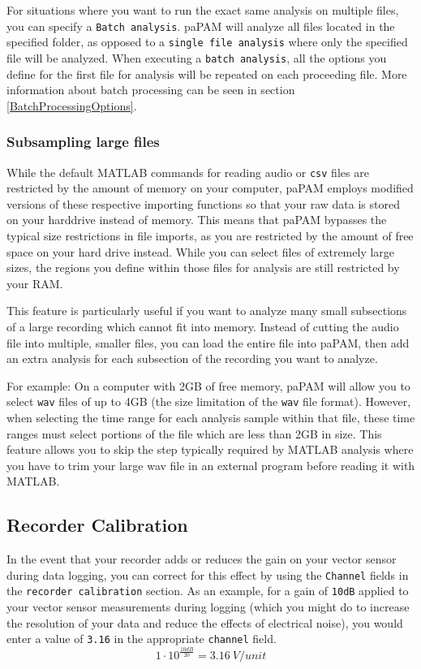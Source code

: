 \documentclass[11pt]{report}
\begin{document}
For situations where you want to run the exact same analysis on multiple
files, you can specify a \texttt{Batch analysis}. paPAM will analyze all files located
in the specified folder, as opposed to a \texttt{single file analysis} where only
the specified file will be analyzed. When executing a \texttt{batch analysis}, all the
options you define for the first file for analysis will be repeated
on each proceeding file. More information about batch processing can be
seen in section \ref{BatchProcessingOptions}.

\subsubsection{Subsampling large files}
While the default MATLAB commands for reading audio or \texttt{csv} files are restricted by the amount of memory on your computer, paPAM employs modified versions of these respective importing functions so that your raw data is stored on your harddrive instead of memory.  This means that paPAM bypasses the typical size restrictions in file imports, as you are restricted by the amount of free space on your hard drive instead.  While you can select files of extremely large sizes, the regions you define within those files for analysis are still restricted by your RAM.  

This feature is particularly useful if you want to analyze many small subsections of a large recording which cannot fit into memory.  Instead of cutting the audio file into multiple, smaller files, you can load the entire file into paPAM, then add an extra analysis for each subsection of the recording you want to analyze.

For example:  On a computer with 2GB of free memory, paPAM will allow you to select \texttt{wav} files of up to 4GB (the size limitation of the \texttt{wav} file format).  However, when selecting the time range for each analysis sample  within that file, these time ranges must select portions of the file which are less than 2GB in size.  This feature allows you to skip the step typically required by MATLAB analysis where you have to trim your large wav file in an external program before reading it with MATLAB.

\subsection{Recorder Calibration}

In the event that your recorder adds or reduces the gain on your vector sensor during data logging, you can correct for this effect by using the \texttt{Channel} fields in the \texttt{recorder calibration} section.  As an example, for a gain of \texttt{10dB} applied to your vector sensor measurements during logging (which you might do to increase the resolution of your data and reduce the effects of electrical noise), you would enter a value of \texttt{3.16} in the appropriate \texttt{channel} field. $$1\cdot10^\frac{10dB}{20} = 3.16\  \mathit{V/unit}$$
\end{document}
